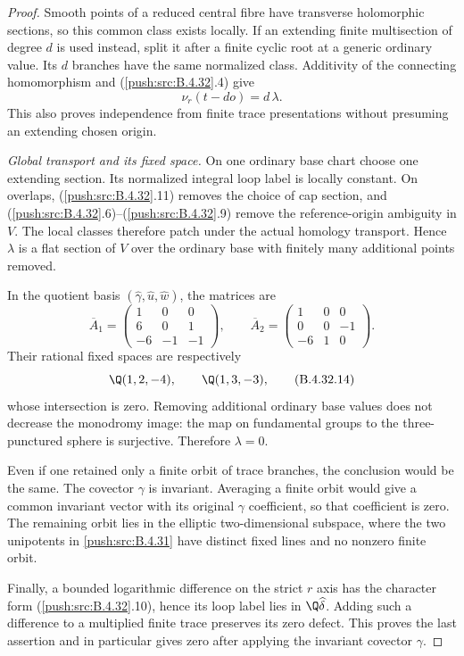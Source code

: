 \begin{proof}
Smooth points of a reduced central fibre have transverse
holomorphic sections, so this common class exists locally.
If an extending finite multisection of degree $d$ is used
instead, split it after a finite cyclic root at a generic
ordinary value. Its $d$ branches have the same normalized
class. Additivity of the connecting homomorphism and
(\ref{push:src:B.4.32}.4) give
\[
            \nu_r(t-do)=d\,\lambda .
 \tag{B.4.32.12}
\]
This also proves independence from finite trace
presentations without presuming an extending chosen origin.

\emph{Global transport and its fixed space.}
On one ordinary base chart choose one extending section.
Its normalized integral loop label is locally constant.
On overlaps, (\ref{push:src:B.4.32}.11) removes the choice of cap section,
and (\ref{push:src:B.4.32}.6)--(\ref{push:src:B.4.32}.9) remove the reference-origin
ambiguity in $V$. The local classes therefore patch under
the actual homology transport. Hence $\lambda$ is a flat
section of $V$ over the ordinary base with finitely many
additional points removed.

In the quotient basis
$(\widehat\gamma,\widehat u,\widehat w)$, the matrices are
\[
 \overline A_1=
 \begin{pmatrix}1&0&0\\6&0&1\\-6&-1&-1\end{pmatrix},
 \qquad
 \overline A_2=
 \begin{pmatrix}1&0&0\\0&0&-1\\-6&1&0\end{pmatrix}.
 \tag{B.4.32.13}
\]
Their rational fixed spaces are respectively
\[
 \Q(1,2,-4),\qquad \Q(1,3,-3),
 \tag{B.4.32.14}
\]
whose intersection is zero. Removing additional ordinary
base values does not decrease the monodromy image: the
map on fundamental groups to the three-punctured sphere
is surjective. Therefore $\lambda=0$.

Even if one retained only a finite orbit of trace branches,
the conclusion would be the same. The covector $\gamma$
is invariant. Averaging a finite orbit would give a common
invariant vector with its original $\gamma$ coefficient,
so that coefficient is zero. The remaining orbit lies in
the elliptic two-dimensional subspace, where the two
unipotents in \ref{push:src:B.4.31} have distinct fixed lines and no
nonzero finite orbit.

Finally, a bounded logarithmic difference on the strict
$r$ axis has the character form (\ref{push:src:B.4.32}.10), hence its
loop label lies in $\Q\widehat\delta$. Adding such a
difference to a multiplied finite trace preserves its
zero defect. This proves the last assertion and in
particular gives zero after applying the invariant
covector $\gamma$.
\end{proof}

